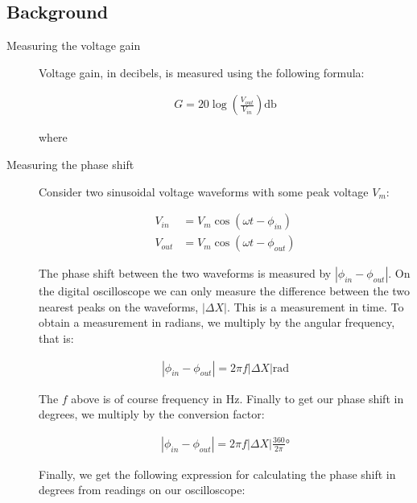 \documentclass{article}
\begin{document}
\subsection{Background}
\label{definitions}
\begin{description}
\item[Measuring the voltage gain]
Voltage gain, in decibels, is measured using the following formula: 

\begin{align}
G = 20 \log (\frac{V_{out}}{V_{in}}) \si{\decibel}
\end{align}

where


\newpage

\item[Measuring the phase shift]
Consider two sinusoidal voltage waveforms with some peak voltage $V_m$:

\begin{align*}
	V_{in} &= V_m \cos(\omega t - \phi_{in}) \\
	V_{out} &= V_m \cos(\omega t - \phi_{out})
\end{align*}

The phase shift between the two waveforms is measured by $|\phi_{in} - \phi_{out}|$. On the digital oscilloscope we can only measure the difference between the two nearest peaks on the waveforms, $|\Delta X|$. This is a measurement in time. To obtain a measurement in radians, we multiply by the angular frequency, that is:

\begin{align*}
	|\phi_{in} - \phi_{out}| = 2 \pi f |\Delta X| \si{\radian}
\end{align*}

The $f$ above is of course frequency in $\si{\hertz}$. Finally to get our phase shift in degrees, we multiply by the conversion factor:

\begin{align*}
	|\phi_{in} - \phi_{out}| = 2 \pi f |\Delta X| \frac{360}{2 \pi} \si{\degree}
\end{align*}

Finally, we get the following expression for calculating the phase shift in degrees from readings on our oscilloscope:


\end{description}
\end{document}
